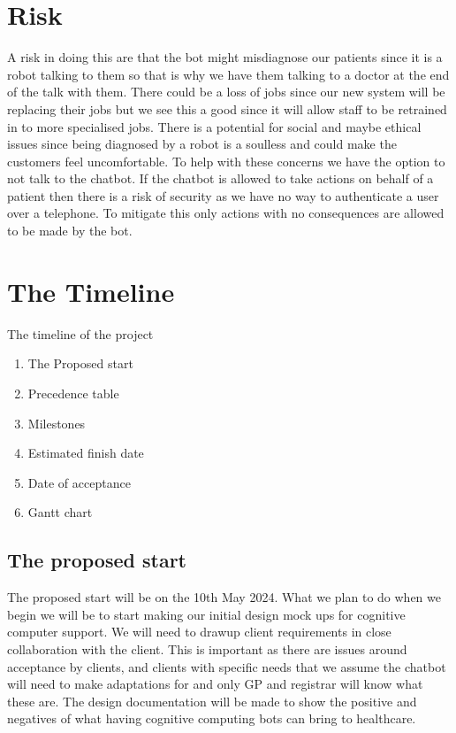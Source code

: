 \documentclass{article}
\begin{document}
\section{Risk}
A risk in doing this are that the bot might misdiagnose our patients since it is a robot talking to them so that is why we have them talking to a doctor at the end of the talk with them. There could be a loss of jobs since our new system will be replacing their jobs but we see this a good since it will allow staff to be retrained in to more specialised jobs. 
There is a potential for social and maybe ethical issues since being diagnosed by a robot is a soulless and could make the customers feel uncomfortable. To help with these concerns we have the option to not talk to the chatbot.
If the chatbot is allowed to take actions on behalf of a patient then there is a risk of security as we have no way to authenticate a user over a telephone. To mitigate this only actions with no consequences are allowed to be made by the bot.

\section{The Timeline}
The timeline of the project
\begin{enumerate}
	\item The Proposed start
	\item Precedence table
	\item Milestones
	\item Estimated finish date
	\item Date of acceptance 
	\item Gantt chart
\end{enumerate}

\subsection{The proposed start}
The proposed start will be on the 10th May 2024. What we plan to do when we begin we will be to start making our initial design mock ups for cognitive computer support.
We will need to drawup client requirements in close collaboration with the client. This is important as there are issues around acceptance by clients, and clients with specific needs that we assume the chatbot will need to make adaptations for and only GP and registrar will know what these are.
The design documentation will be made to show the positive and negatives of what having cognitive computing bots can bring to healthcare.
\end{document}
